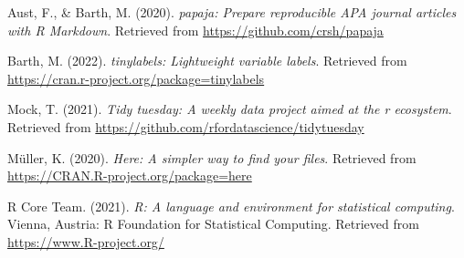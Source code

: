\documentclass[
  man]{apa6}
\newlength{\cslhangindent}
\newlength{\cslentryspacingunit} %
\newenvironment{CSLReferences}[2] %
 {%
  \setlength{\parindent}{0pt}
  \ifodd #1
  \let\oldpar\par
  \def\par{\hangindent=\cslhangindent\oldpar}
  \fi
  \setlength{\parskip}{#2\cslentryspacingunit}
 }%
 {}
\begin{document}
\hypertarget{refs}{}
\begin{CSLReferences}{1}{0}
\leavevmode{}%
Aust, F., \& Barth, M. (2020). \emph{{papaja}: {Prepare} reproducible {APA} journal articles with {R Markdown}}. Retrieved from \url{https://github.com/crsh/papaja}

\leavevmode{}%
Barth, M. (2022). \emph{{tinylabels}: Lightweight variable labels}. Retrieved from \url{https://cran.r-project.org/package=tinylabels}

\leavevmode{}%
Mock, T. (2021). \emph{Tidy tuesday: A weekly data project aimed at the r ecosystem}. Retrieved from \url{https://github.com/rfordatascience/tidytuesday}

\leavevmode{}%
Müller, K. (2020). \emph{Here: A simpler way to find your files}. Retrieved from \url{https://CRAN.R-project.org/package=here}

\leavevmode{}%
R Core Team. (2021). \emph{R: A language and environment for statistical computing}. Vienna, Austria: R Foundation for Statistical Computing. Retrieved from \url{https://www.R-project.org/}

\end{CSLReferences}

\endgroup
\end{document}
